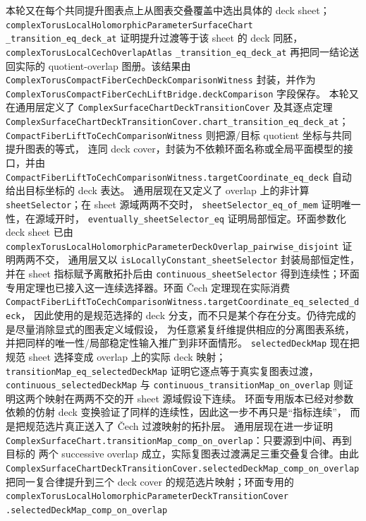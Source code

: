 \documentclass[UTF8,fontset=none,a4paper,11pt]{ctexart}
\begin{document}
\begin{sloppypar}
本轮又在每个共同提升图表点上从图表交叠覆盖中选出具体的 deck sheet；
\texttt{complexTorusLocalHolomorphicParameterSurfaceChart}\allowbreak
\texttt{\_transition\_eq\_deck\_at}
证明提升过渡等于该 sheet 的 deck 同胚，
\texttt{complexTorusLocalCechOverlapAtlas}\allowbreak
\texttt{\_transition\_eq\_deck\_at}
再把同一结论送回实际的 quotient-overlap 图册。该结果由
\texttt{ComplexTorusCompactFiberCechDeckComparisonWitness} 封装，并作为
\texttt{ComplexTorusCompactFiberCechLiftBridge.deckComparison} 字段保存。
本轮又在通用层定义了
\texttt{ComplexSurfaceChartDeckTransitionCover} 及其逐点定理
\texttt{ComplexSurfaceChartDeckTransitionCover.chart\_transition\_eq\_deck\_at}；
\texttt{CompactFiberLiftToCechComparisonWitness} 则把源/目标 quotient 坐标与共同提升图表的等式，
连同 deck cover，封装为不依赖环面名称或全局平面模型的接口，并由
\texttt{CompactFiberLiftToCechComparisonWitness.targetCoordinate\_eq\_deck} 自动给出目标坐标的 deck 表达。
通用层现在又定义了 overlap 上的非计算 \texttt{sheetSelector}；在 sheet 源域两两不交时，
\texttt{sheetSelector\_eq\_of\_mem} 证明唯一性，在源域开时，
\texttt{eventually\_sheetSelector\_eq} 证明局部恒定。环面参数化 deck sheet 已由
\texttt{complexTorusLocalHolomorphicParameterDeckOverlap\_pairwise\_disjoint} 证明两两不交，
通用层又以 \texttt{isLocallyConstant\_sheetSelector} 封装局部恒定性，并在 sheet 指标赋予离散拓扑后由
\texttt{continuous\_sheetSelector} 得到连续性；环面专用定理也已接入这一连续选择器。环面 Čech 定理现在实际消费
\texttt{CompactFiberLiftToCechComparisonWitness.targetCoordinate\_eq\_selected\_deck}，
因此使用的是规范选择的 deck 分支，而不只是某个存在分支。仍待完成的是尽量消除显式的图表定义域假设，
为任意紧复纤维提供相应的分离图表系统，并把同样的唯一性/局部稳定性输入推广到非环面情形。
\texttt{selectedDeckMap} 现在把规范 sheet 选择变成 overlap 上的实际 deck 映射；
\texttt{transitionMap\_eq\_selectedDeckMap} 证明它逐点等于真实复图表过渡，
\texttt{continuous\_selectedDeckMap} 与
\texttt{continuous\_transitionMap\_on\_overlap} 则证明这两个映射在两两不交的开 sheet 源域假设下连续。
环面专用版本已经对参数依赖的仿射 deck 变换验证了同样的连续性，因此这一步不再只是“指标连续”，
而是把规范选片真正送入了 Čech 过渡映射的拓扑层。
通用层现在进一步证明
\texttt{ComplexSurfaceChart.transitionMap\_comp\_on\_overlap}：只要源到中间、再到目标的
两个 successive overlap 成立，实际复图表过渡满足三重交叠复合律。由此
\texttt{ComplexSurfaceChartDeckTransitionCover.selectedDeckMap\_comp\_on\_overlap}
把同一复合律提升到三个 deck cover 的规范选片映射；环面专用的
\texttt{complexTorusLocalHolomorphicParameterDeckTransitionCover}\allowbreak
\texttt{.selectedDeckMap\_comp\_on\_overlap}

\end{sloppypar}
\end{document}
